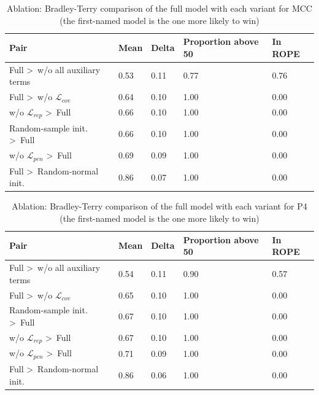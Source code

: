 \begin{table}[H]
\caption{Ablation: Bradley-Terry comparison of the full model with each variant for MCC (the first-named model is the one more likely to win)}
\label{tab:BTablationMCC}
\centering
\scriptsize
\begin{tabular}{@{}lllll@{}}
\toprule
Pair & Mean & Delta & Proportion above 50 & In ROPE \\
\midrule
Full \textgreater\ w/o all auxiliary terms & 0.53 & 0.11 & 0.77 & 0.76 \\
Full \textgreater\ w/o $\mathcal{L}_{cov}$ & 0.64 & 0.10 & 1.00 & 0.00 \\
w/o $\mathcal{L}_{rep}$ \textgreater\ Full & 0.66 & 0.10 & 1.00 & 0.00 \\
Random-sample init. \textgreater\ Full & 0.66 & 0.10 & 1.00 & 0.00 \\
w/o $\mathcal{L}_{pen}$ \textgreater\ Full & 0.69 & 0.09 & 1.00 & 0.00 \\
Full \textgreater\ Random-normal init. & 0.86 & 0.07 & 1.00 & 0.00 \\
\bottomrule
\end{tabular}%
\end{table}

\begin{table}[H]
\caption{Ablation: Bradley-Terry comparison of the full model with each variant for P4 (the first-named model is the one more likely to win)}
\label{tab:BTablationP4}
\centering
\scriptsize
\begin{tabular}{@{}lllll@{}}
\toprule
Pair & Mean & Delta & Proportion above 50 & In ROPE \\
\midrule
Full \textgreater\ w/o all auxiliary terms & 0.54 & 0.11 & 0.90 & 0.57 \\
Full \textgreater\ w/o $\mathcal{L}_{cov}$ & 0.65 & 0.10 & 1.00 & 0.00 \\
Random-sample init. \textgreater\ Full & 0.67 & 0.10 & 1.00 & 0.00 \\
w/o $\mathcal{L}_{rep}$ \textgreater\ Full & 0.67 & 0.10 & 1.00 & 0.00 \\
w/o $\mathcal{L}_{pen}$ \textgreater\ Full & 0.71 & 0.09 & 1.00 & 0.00 \\
Full \textgreater\ Random-normal init. & 0.86 & 0.06 & 1.00 & 0.00 \\
\bottomrule
\end{tabular}%
\end{table}

